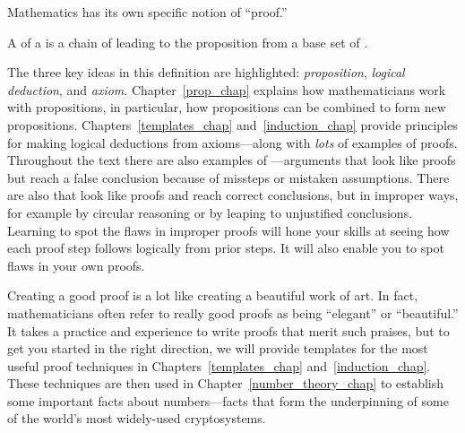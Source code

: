 Mathematics has its own specific notion of ``proof.''

\begin{definition*}
A  of a  is a chain of  leading to the proposition from a base set of .
\end{definition*}

The three key ideas in this definition are highlighted:
\emph{proposition}, \emph{logical deduction}, and \emph{axiom}.
Chapter~\ref{prop_chap} explains how mathematicians work with  propositions, in particular, how propositions can be combined
to form new propositions.  Chapters~\ref{templates_chap}
and~\ref{induction_chap} provide principles for making logical deductions
from axioms---along with \emph{lots} of examples of proofs.  Throughout
the text there are also examples of ---arguments that
look like proofs but reach a false conclusion because of missteps or
mistaken assumptions.   There are also
 that look like proofs and reach correct
 conclusions, but in improper ways, for example
by circular reasoning or by leaping to unjustified conclusions.  Learning
to spot the flaws in improper proofs will hone your skills at seeing how
each proof step follows logically from prior steps.  It will also enable
you to spot flaws in your own proofs.

Creating a good proof is a lot like creating a beautiful work of art.  In
fact, mathematicians often refer to really good proofs as being
``elegant'' or ``beautiful.''  It takes a practice and experience to write
proofs that merit such praises,  but to get you started in
the right direction, we will provide templates for the most useful proof
techniques in Chapters~\ref{templates_chap} and~\ref{induction_chap}.
These techniques are then used in Chapter~\ref{number_theory_chap} to
establish some important facts about numbers---facts that form the
 underpinning of some of the world's most
widely-used cryptosystems.


\endinput
